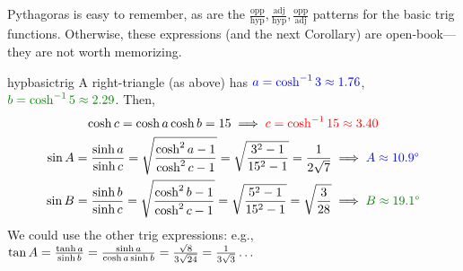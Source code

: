 Pythagoras is easy to remember, as are the $\frac{\text{opp}}{\text{hyp}},\frac{\text{adj}}{\text{hyp}},\frac{\text{opp}}{\text{adj}}$ patterns for the basic trig functions. Otherwise, these expressions (and the next Corollary) are open-book---they are not worth memorizing.

\begin{examples}{}{hypbasictrig}
	\exstart A right-triangle (as above) has $\textcolor{blue}{a=\cosh^{-1}3\approx 1.76}$, \ $\textcolor{Green}{b=\cosh^{-1}5\approx 2.29}$. Then,
	\begin{gather*}
		\cosh c=\cosh a\cosh b=15\implies \textcolor{red}{c=\cosh^{-1}15\approx 3.40}\\
		\sin A=\frac{\sinh a}{\sinh c} =\sqrt{\frac{\cosh^2a-1}{\cosh^2 c-1}} =\sqrt{\frac{3^2-1}{15^2-1}} =\frac 1{2\sqrt 7} \implies \textcolor{blue}{A\approx \ang{10.9}}\\
		\sin B=\frac{\sinh b}{\sinh c} =\sqrt{\frac{\cosh^2b-1}{\cosh^2 c-1}} =\sqrt{\frac{5^2-1}{15^2-1}}=\sqrt{\frac 3{28}} \implies \textcolor{Green}{B\approx \ang{19.1}}
	\end{gather*}
	We could use the other trig expressions: e.g., $\tan A=\smash{\frac{\tanh a}{\sinh b}=\frac{\sinh a}{\cosh a\sinh b}=\frac{\sqrt 8}{3\sqrt{24}} =\frac 1{3\sqrt 3} \ldots}$
	
	
	\goodbreak
	

\end{examples}
